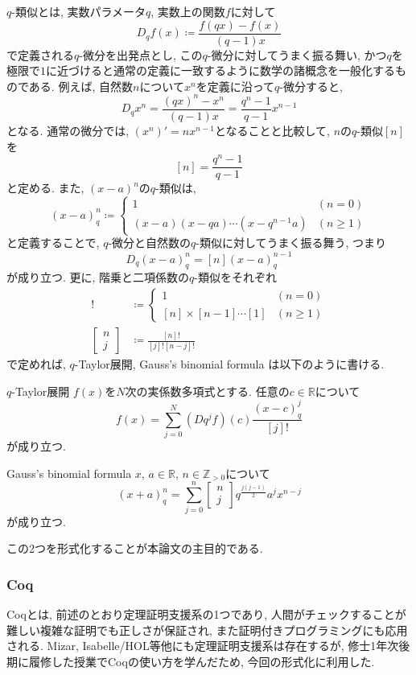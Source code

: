 \documentclass[11pt]{jsreport}
\theoremstyle{mystyle}
\newcommand{\Z}{\mathbb{Z}}
\newcommand{\R}{\mathbb{R}}
\newcommand{\qcoe}[2]{\left[\begin{array}{ccc}#1\\#2\end{array}\right]}
\newcommand{\0}{\textbf{0}}
\begin{document}
$q$-類似とは, 実数パラメータ$q$, 実数上の関数$f$に対して
\[
  D_q f(x) \coloneqq \frac{f(qx) - f(x)}{(q - 1) x}
\]
で定義される$q$-微分を出発点とし, この$q$-微分に対してうまく振る舞い, かつ$q$を極限で$1$に近づけると通常の定義に一致するように数学の諸概念を一般化するものである.
例えば, 自然数$n$について$x^n$を定義に沿って$q$-微分すると, 
\[
  D_q x^n = \frac{(qx)^n - x^n}{(q - 1) x} = \frac{q^n - 1}{q - 1} x^{n - 1}
\]
となる. 通常の微分では, $(x^n)' = n x^{n - 1}$となることと比較して, $n$の$q$-類似$[n]$を
\[
  [n] = \frac{q^n - 1}{q - 1}
\]
と定める. また, $(x - a)^n$の$q$-類似は, 
\[
  (x - a)^n_q \coloneqq \begin{cases}
                                  1 & (n = 0) \\
                                  (x - a) (x - qa) \cdots (x - q^{n - 1} a) & (n \ge 1)
                                \end{cases}
\]
と定義することで, $q$-微分と自然数の$q$-類似に対してうまく振る舞う, つまり
\[
  D_q (x - a)^n_q = [n](x - a)^{n - 1}_q
\]
が成り立つ. 更に, 階乗と二項係数の$q$-類似をそれぞれ
\begin{align*}
  [n]! &\coloneqq \begin{cases}
                        1 & (n = 0)\\
                        [n] \times [n   - 1] \cdots [1] & (n \ge 1)
                      \end{cases}\\
  \qcoe{n}{j} &\coloneqq \frac{[n]!}{[j]![n - j]!}
\end{align*}
で定めれば, $q$-Taylor展開, Gauss's binomial formula は以下のように書ける. 
\begin{itembox}{$q$-Taylor展開}
  $f(x)$を$N$次の実係数多項式とする. 任意の$c \in \R$について
  \[
    f(x) = \sum_{j = 0}^N (Dq^j f) (c) \frac{(x - c)^j_q}{[j]!}
  \]
  が成り立つ. 
\end{itembox}
\begin{itembox}{Gauss's binomial formula}
  $x$, $a \in \R$, $n \in \Z_{>0}$について
  \[
    (x+a)^n_q = \sum_{j=0}^n \qcoe{n}{j} q^{\frac{j(j-1)}{2}} a^j x^{n-j}
  \]
  が成り立つ. 
\end{itembox}
この2つを形式化することが本論文の主目的である. 
\subsubsection*{Coq}
Coqとは, 前述のとおり定理証明支援系の1つであり, 人間がチェックすることが難しい複雑な証明でも正しさが保証され, また証明付きプログラミングにも応用される. Mizar, Isabelle/HOL等他にも定理証明支援系は存在するが, 修士1年次後期に履修した授業でCoqの使い方を学んだため, 今回の形式化に利用した. 
\end{document}
